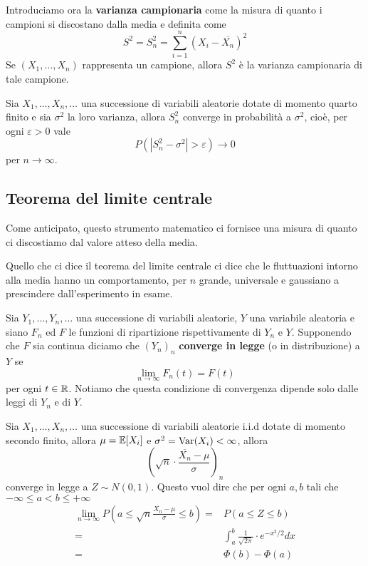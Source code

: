 Introduciamo ora la \textbf{varianza campionaria} come la misura di quanto i campioni si
discostano dalla media e definita come
\[ S^2 = S_n^2 = \sum_{i=1}^n \left( X_i - \overline{X_n} \right)^2 \]
Se $(X_1, \dots, X_n)$ rappresenta un campione, allora $S^2$ è la varianza campionaria di tale
campione.

\begin{proposition}
	Sia $X_1, \dots, X_n, \dots$ una successione di variabili aleatorie dotate di momento quarto
	finito e sia $\sigma^2$ la loro varianza, allora $S_n^2$ converge in probabilità a $\sigma^2$,
	cioè, per ogni $\varepsilon > 0$ vale
	\[ P(|S_n^2 - \sigma^2| > \varepsilon) \to 0 \]
	per $n \to \infty$.
\end{proposition}

\subsection{Teorema del limite centrale}
Come anticipato, questo strumento matematico ci fornisce una misura di quanto ci discostiamo dal
valore atteso della media.

Quello che ci dice il teorema del limite centrale ci dice che le fluttuazioni intorno alla media
hanno un comportamento, per $n$ grande, universale e gaussiano a prescindere dall'esperimento in
esame.

\begin{definition}
	Sia $Y_1, \dots, Y_n, \dots$ una successione di variabili aleatorie, $Y$ una variabile
	aleatoria e siano $F_n$ ed $F$ le funzioni di ripartizione rispettivamente di $Y_n$ e $Y$.
	Supponendo che $F$ sia continua diciamo che $(Y_n)_n$ \textbf{converge in legge} (o in
	distribuzione) a $Y$ se
	\[ \lim_{n \to \infty} F_n (t) = F(t) \]
	per ogni $t \in \mathbb{R}$. Notiamo che questa condizione di convergenza dipende solo dalle leggi di
	$Y_n$ e di $Y$.
\end{definition}

\begin{theorem}
	Sia $X_1, \dots, X_n, \dots$ una successione di variabili aleatorie i.i.d dotate di momento
	secondo finito, allora $\mu = \mathbb{E}[X_i]$ e $\sigma^2 = \operatorname{Var}(X_i) < \infty$, allora
	\[ \left( \sqrt{n} \cdot \frac{\overline{X_n} - \mu}{\sigma} \right)_n \]
	converge in legge a $Z \sim N(0,1)$. Questo vuol dire che per ogni $a, b$ tali che
	$-\infty \leq a < b \leq +\infty$
	\begin{align*}
		\lim_{n \to \infty} P\left( a \leq \sqrt{n} \frac{\overline{X_n} -
		\mu}{\sigma} \leq b \right) = & P(a \leq Z \leq b)                                      \\
		=                             & \int_{a}^{b} \frac{1}{\sqrt{2 \pi}} \cdot e^{-x^2/2} dx \\
		=                             & \Phi(b) - \Phi(a)
	\end{align*}
\end{theorem}

